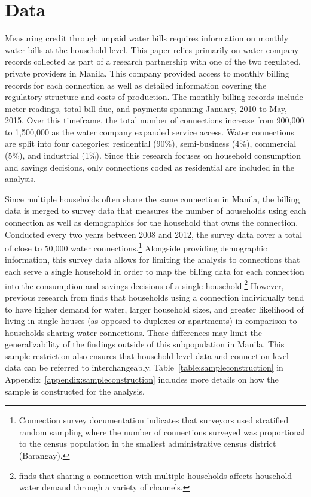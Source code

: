 \documentclass[12pt]{article}
\begin{document}
\section{Data}


Measuring credit through unpaid water bills requires information on monthly water bills at the household level.  This paper relies primarily on water-company records collected as part of a research partnership with one of the two regulated, private providers in Manila.  This company provided access to monthly billing records for each connection as well as detailed information covering the regulatory structure and costs of production.  The monthly billing records include meter readings, total bill due, and payments spanning January, 2010 to May, 2015.  Over this timeframe, the total number of connections increase from 900,000 to 1,500,000 as the water company expanded service access.  Water connections are split into four categories: residential (90\%), semi-business (4\%), commercial (5\%), and industrial (1\%).  Since this research focuses on household consumption and savings decisions, only connections coded as residential are included in the analysis.  


Since multiple households often share the same connection in Manila, the billing data is merged to survey data that measures the number of households using each connection as well as demographics for the household that owns the connection.  Conducted every two years between 2008 and 2012, the survey data cover a total of close to 50,000 water connections.\footnote{Connection survey documentation indicates that surveyors used stratified random sampling where the number of connections surveyed was proportional to the census population in the smallest administrative census district (Barangay).}  Alongside providing demographic information, this survey data allows for limiting the analysis to connections that each serve a single household in order to map the billing data for each connection into the consumption and savings decisions of a single household.\footnote{\cite{wjv} finds that sharing a connection with multiple households affects household water demand through a variety of channels.}   However, previous research from \cite{wjv} finds that households using a connection individually tend to have higher demand for water, larger household sizes, and greater likelihood of living in single houses (as opposed to duplexes or apartments) in comparison to households sharing water connections.  These differences may limit the generalizability of the findings outside of this subpopulation in Manila.  This sample restriction also ensures that household-level data and connection-level data can be referred to interchangeably.  Table~\ref{table:sampleconstruction} in Appendix~\ref{appendix:sampleconstruction} includes more details on how the sample is constructed for the analysis.
\end{document}
